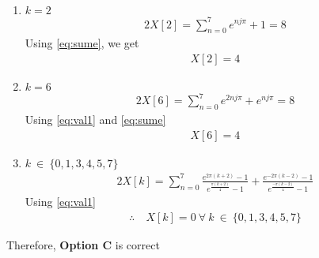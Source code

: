 \documentclass[journal,12pt,twocolumn]{IEEEtran}
\begin{document}
\begin{enumerate}
        \item $k=2$
            \begin{align}
                2X[2]=\displaystyle \sum_{n=0}^7 e^{nj\pi}+1=8
            \end{align}
            Using \eqref{eq:sume}, we get
            \begin{align}
                X[2]=4
            \end{align}
        \item $k=6$
            \begin{align}
                2X[6]=\displaystyle \sum_{n=0}^7 e^{2nj\pi}+e^{nj\pi}=8
            \end{align}
            Using \eqref{eq:val1} and \eqref{eq:sume}
                \begin{align}
                    X[6]=4
                \end{align}
        \item $k\ \in\ \{0,1,3,4,5,7\}$
            \begin{align}
                2X[k]=\displaystyle \sum_{n=0}^7 \frac{e^{2\pi (k+2)}-1}{e^{\frac{\pi (k+2)}{4}}-1}+\frac{e^{-2\pi (k-2)}-1}{e^{\frac{-\pi (k-2)}{4}}-1}
            \end{align}
            Using \eqref{eq:val1}
                \begin{align}
                    \therefore \ & X[k]=0\ \forall\ k\ \in\ \{0,1,3,4,5,7\}
                \end{align}
\end{enumerate}
Therefore, \textbf{Option C} is correct
\end{document}
